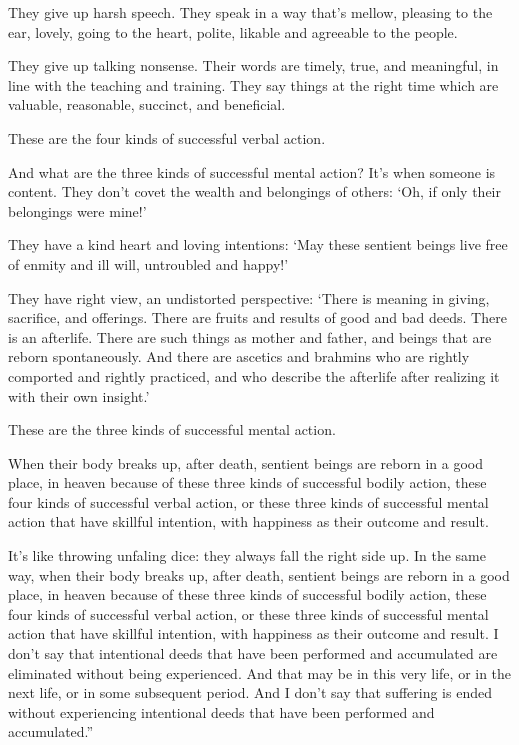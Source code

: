 \documentclass[12pt,openany]{book}%
\begin{document}
They give up harsh speech. They speak in a way that’s mellow, pleasing to the ear, lovely, going to the heart, polite, likable and agreeable to the people. 

They give up talking nonsense. Their words are timely, true, and meaningful, in line with the teaching and training. They say things at the right time which are valuable, reasonable, succinct, and beneficial. 

These are the four kinds of successful verbal action. 

And what are the three kinds of successful mental action? It’s when someone is content. They don’t covet the wealth and belongings of others: ‘Oh, if only their belongings were mine!’ 

They have a kind heart and loving intentions: ‘May these sentient beings live free of enmity and ill will, untroubled and happy!’ 

They have right view, an undistorted perspective: ‘There is meaning in giving, sacrifice, and offerings. There are fruits and results of good and bad deeds. There is an afterlife. There are such things as mother and father, and beings that are reborn spontaneously. And there are ascetics and brahmins who are rightly comported and rightly practiced, and who describe the afterlife after realizing it with their own insight.’ 

These are the three kinds of successful mental action. 

When their body breaks up, after death, sentient beings are reborn in a good place, in heaven because of these three kinds of successful bodily action, these four kinds of successful verbal action, or these three kinds of successful mental action that have skillful intention, with happiness as their outcome and result. 

It’s like throwing unfaling dice: they always fall the right side up. In the same way, when their body breaks up, after death, sentient beings are reborn in a good place, in heaven because of these three kinds of successful bodily action, these four kinds of successful verbal action, or these three kinds of successful mental action that have skillful intention, with happiness as their outcome and result. I don’t say that intentional deeds that have been performed and accumulated are eliminated without being experienced. And that may be in this very life, or in the next life, or in some subsequent period. And I don’t say that suffering is ended without experiencing intentional deeds that have been performed and accumulated.” 
\end{document}
